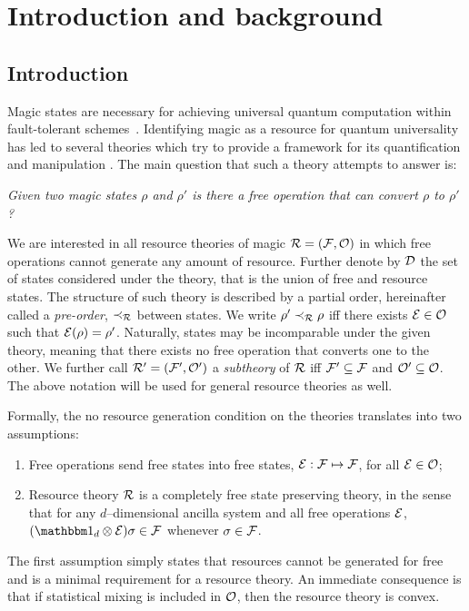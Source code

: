 \documentclass[pra,
aps,
twocolumn,
superscriptaddress,
groupedaddress,
nofootinbib,
reprint
]{revtex4-1}
\begin{document}
\section{Introduction and background}
\label{sec:intro_prev}

\subsection{Introduction}
\label{sec:intro}

Magic states are necessary for achieving universal quantum computation within fault-tolerant schemes~\cite{cit:veitch, cit:mari, cit:gottesman, cit:bravyi, cit:knill, Campbell_2011}.
Identifying magic as a resource for quantum universality has led to several theories which try to provide a framework for its quantification and manipulation \cite{cit:veitch2, cit:howard, Wang_2019, Seddon_2021}.
The main question that such a theory attempts to answer is:
\begin{center}
    \emph{Given two magic states $\rho$ and $\rho'$ is there a free operation that can convert $\rho$ to $\rho'$?}
\end{center}

We are interested in all resource theories of magic $\mathcal{R} = (\mathcal{F}, \mathcal{O})$ in which free operations cannot generate any amount of resource. 
Further denote by $\mathcal{D}$ the set of states considered under the theory, that is the union of free and resource states.
The structure of such theory is described by a partial order, hereinafter called a \emph{pre-order}, $\prec_{\mathcal{R}}$ between states.
We write $\rho' \prec_{\mathcal{R}} \rho$ iff there exists $\mathcal{E} \in \mathcal{O}$ such that $\mathcal{E}(\rho) = \rho'$.
Naturally, states may be incomparable under the given theory, meaning that there exists no free operation that converts one to the other.
We further call $\mathcal{R}' = (\mathcal{F}', \mathcal{O}')$ a \emph{subtheory} of $\mathcal{R}$ iff $\mathcal{F}' \subseteq \mathcal{F}$ and $\mathcal{O}' \subseteq \mathcal{O}$. 
The above notation will be used for general resource theories as well.

Formally, the no resource generation condition on the theories translates into two assumptions:
\begin{enumerate}[I]
    \item Free operations send free states into free states, $\mathcal{E}: \mathcal{F} \mapsto \mathcal{F}$, for all $\mathcal{E} \in \mathcal{O}$;
    \item Resource theory $\mathcal{R}$ is a completely free state preserving theory, in the sense that for any $d$--dimensional ancilla system and all free operations $\mathcal{E}$, $(\id_d \otimes \E ) \sigma \in \F$ whenever $\sigma \in \mathcal{F}$.
\end{enumerate}
The first assumption simply states that resources cannot be generated for free and is a minimal requirement for a resource theory. 
An immediate consequence is that if statistical mixing is included in $\mathcal{O}$, then the resource theory is convex.
\end{document}
